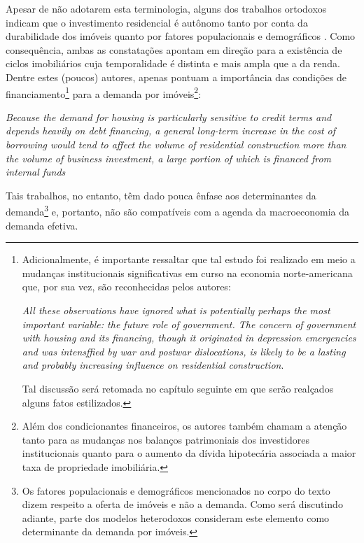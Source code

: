 Apesar de não adotarem esta terminologia, alguns dos trabalhos ortodoxos indicam que o investimento residencial é autônomo tanto por conta da durabilidade dos imóveis \cite{derksen_long_1940} quanto por fatores populacionais e demográficos \cites{hansen_economic_1939}{grebler_capital_1956}. Como consequência, ambas as constatações apontam em direção para a existência de ciclos imobiliários cuja temporalidade é distinta e mais ampla que a da renda. 
Dentre estes (poucos) autores, apenas \textcite{grebler_capital_1956} pontuam a importância das condições de financiamento\footnote{
	Adicionalmente, é importante ressaltar que tal estudo foi realizado em meio a mudanças institucionais significativas em curso na economia norte-americana que, por sua vez, são reconhecidas pelos autores:
	
	\begin{citacao}
		\textit{All these observations have ignored what is potentially perhaps the most important variable: the future role of government. The concern
			of government with housing and its financing, though it originated in
			depression emergencies and was intensffied by war and postwar dislocations, is likely to be a lasting and probably increasing influence on
			residential construction}.
		\cite[p.~27]{grebler_capital_1956}
	\end{citacao}
	Tal discussão será retomada no capítulo seguinte em que serão realçados alguns fatos estilizados.
} para a demanda por imóveis\footnote{Além dos condicionantes financeiros, os autores também chamam a atenção tanto para as mudanças nos balanços patrimoniais dos investidores institucionais quanto para o aumento da dívida hipotecária associada a maior taxa de propriedade imobiliária.
}:

\begin{citacao}
	\textit{Because the demand for housing is particularly sensitive to credit
		terms and depends heavily on debt financing, a general long-term increase
		in the cost of borrowing would tend to affect the volume of
		residential construction more than the volume of business investment,
		a large portion of which is financed from internal funds}
	\cite[p.~322--3]{grebler_capital_1956}
\end{citacao}
Tais trabalhos, no entanto, têm dado pouca ênfase aos determinantes da demanda\footnote{Os fatores populacionais e demográficos mencionados no corpo do texto dizem respeito a oferta de imóveis e não a demanda. Como será discutindo adiante, parte dos modelos heterodoxos consideram este elemento como determinante da demanda por imóveis.} e, portanto, não são compatíveis com a agenda da macroeconomia da demanda efetiva.

